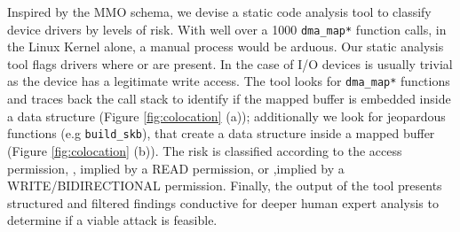 Inspired by the MMO schema, we devise a static code analysis tool to classify device drivers by levels of risk. With well over a 1000 \texttt{dma\_map*} function calls, in the Linux Kernel alone, a manual process would be arduous.
Our static analysis tool flags drivers where \means{} or \oportunity{} are present. In the case of I/O devices \motivation{} is usually trivial as the device has a legitimate write access. The tool looks for \texttt{dma\_map*} functions and traces back the call stack to identify if the mapped buffer is embedded inside a data structure (Figure \ref{fig:colocation} (a)); additionally we look for jeopardous functions (e.g \texttt{build\_skb}), that create a data structure inside a mapped buffer (Figure \ref{fig:colocation} (b)). The risk is classified according to the access permission, \motivation{}, implied by a READ permission, or \oportunity{} ,implied by a WRITE/BIDIRECTIONAL permission. 
Finally, the output of the tool presents structured and filtered findings conductive for deeper human expert analysis to determine if a viable attack is feasible.


